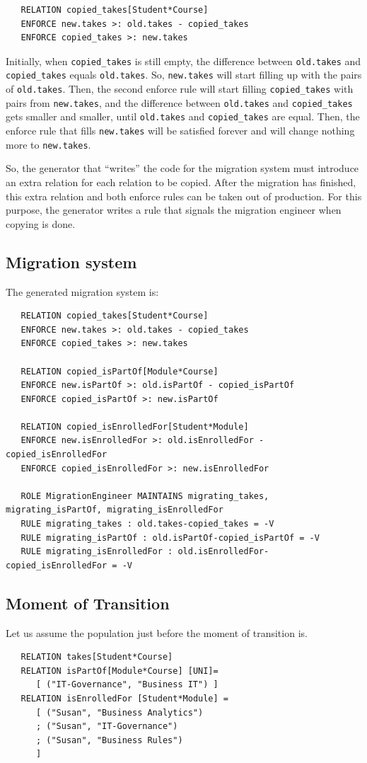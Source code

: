 \documentclass{elsarticle}
\begin{document}
\begin{verbatim}
   RELATION copied_takes[Student*Course]
   ENFORCE new.takes >: old.takes - copied_takes
   ENFORCE copied_takes >: new.takes
\end{verbatim}
   Initially, when {\tt copied\_takes} is still empty, the difference between {\tt old.takes} and {\tt copied\_takes} equals {\tt old.takes}.
   So, {\tt new.takes} will start filling up with the pairs of {\tt old.takes}.
   Then, the second enforce rule will start filling {\tt copied\_takes} with pairs from {\tt new.takes},
   and the difference between {\tt old.takes} and {\tt copied\_takes} gets smaller and smaller, until {\tt old.takes} and {\tt copied\_takes} are equal.
   Then, the enforce rule that fills {\tt new.takes} will be satisfied forever and will change nothing more to {\tt new.takes}.

   So, the generator that ``writes'' the code for the migration system must introduce an extra relation for each relation to be copied.
   After the migration has finished, this extra relation and both enforce rules can be taken out of production.
   For this purpose, the generator writes a rule that signals the migration engineer when copying is done.

\subsection{Migration system}
   The generated migration system is:
\begin{verbatim}
   RELATION copied_takes[Student*Course]
   ENFORCE new.takes >: old.takes - copied_takes
   ENFORCE copied_takes >: new.takes

   RELATION copied_isPartOf[Module*Course]
   ENFORCE new.isPartOf >: old.isPartOf - copied_isPartOf
   ENFORCE copied_isPartOf >: new.isPartOf

   RELATION copied_isEnrolledFor[Student*Module]
   ENFORCE new.isEnrolledFor >: old.isEnrolledFor - copied_isEnrolledFor
   ENFORCE copied_isEnrolledFor >: new.isEnrolledFor

   ROLE MigrationEngineer MAINTAINS migrating_takes, migrating_isPartOf, migrating_isEnrolledFor
   RULE migrating_takes : old.takes-copied_takes = -V
   RULE migrating_isPartOf : old.isPartOf-copied_isPartOf = -V
   RULE migrating_isEnrolledFor : old.isEnrolledFor-copied_isEnrolledFor = -V
\end{verbatim}

\subsection{Moment of Transition}
   Let us assume the population just before the moment of transition is.
\begin{verbatim}
   RELATION takes[Student*Course]
   RELATION isPartOf[Module*Course] [UNI]=
      [ ("IT-Governance", "Business IT") ]
   RELATION isEnrolledFor [Student*Module] =
      [ ("Susan", "Business Analytics")
      ; ("Susan", "IT-Governance")
      ; ("Susan", "Business Rules")
      ]
\end{verbatim}
\end{document}
